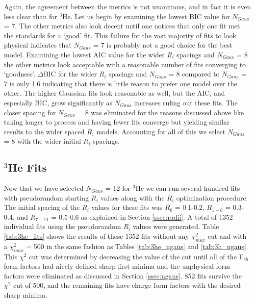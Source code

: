 Again, the agreement between the metrics is not unanimous, and in fact it is even less clear than for $^3$He. Let us begin by examining the lowest BIC value for $N_{Gaus}$ = 7. The other metrics also look decent until one notices that only one fit met the standards for a `good' fit. This failure for the vast majority of fits to look physical indicates that $N_{Gaus}$ = 7 is probably not a good choice for the best model. Examining the lowest AIC value for the wider $R_i$ spacings and $N_{Gaus}$ = 8 the other metrics look acceptable with a reasonable number of fits converging to `goodness'. $\Delta$BIC for the wider $R_i$ spacings and $N_{Gaus}$ = 8 compared to $N_{Gaus}$ = 7 is only 1.6 indicating that there is little reason to prefer one model over the other. The higher Gaussian fits look reasonable as well, but the AIC, and especially BIC, grow significantly as $N_{Gaus}$ increases ruling out these fits. The closer spacing for $N_{Gaus}$ = 8 was eliminated for the reasons discussed above like taking longer to process and having fewer fits converge but yielding similar results to the wider spaced $R_i$ models. Accounting for all of this we select $N_{Gaus}$ = 8 with the wider initial $R_i$ spacings.

\subsection{$^3$He Fits}
\label{ssec:3he_fits}

Now that we have selected $N_{Gaus}$ = 12 for $^3$He we can run several hundred fits with pseudorandom starting $R_i$ values along with the $R_i$ optimization procedure. The initial spacing of the $R_i$ values for these fits was $R_0$ = 0.1-0.2, $R_{1-6}$ = 0.3-0.4, and $R_{7-11}$ = 0.5-0.6 as explained in Section \ref{ssec:radii}. A total of 1352 individual fits using the pseudorandom $R_i$ values were generated. Table \ref{tab:3he_fits} shows the results of these 1352 fits without any $\chi^2_{max}$ cut and with a $\chi^2_{max}$ = 500 in the same fashion as Tables \ref{tab:3he_ngaus} and \ref{tab:3h_ngaus}. This $\chi^2$ cut was determined by decreasing the value of the cut until all of the F$_{ch}$ form factors had nicely defined sharp first minima and the unphysical form factors were eliminated as discussed in Section \ref{ssec:ngaus}. 852 fits survive the $\chi^2$ cut of 500, and the remaining fits have charge form factors with the desired sharp minima.

